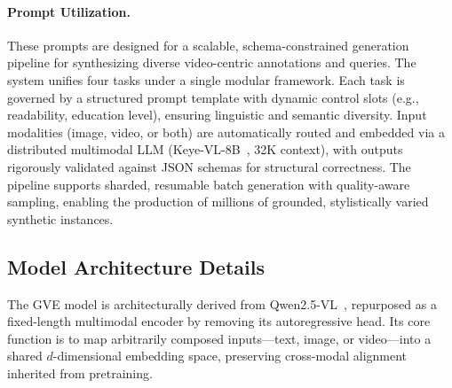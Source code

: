 \paragraph{Prompt Utilization.}
These prompts are designed for a scalable, schema-constrained generation pipeline for synthesizing diverse video-centric annotations and queries. The system unifies four tasks under a single modular framework.
Each task is governed by a structured prompt template with dynamic control slots (e.g., readability, education level), ensuring linguistic and semantic diversity. Input modalities (image, video, or both) are automatically routed and embedded via a distributed multimodal LLM (Keye-VL-8B~\cite{team2025kwai}, 32K context), with outputs rigorously validated against JSON schemas for structural correctness.
The pipeline supports sharded, resumable batch generation with quality-aware sampling, enabling the production of millions of grounded, stylistically varied synthetic instances.


\fi

\iffalse %
\subsection{Model Architecture Details}
\label{gve:app:arch}

The GVE model is architecturally derived from Qwen2.5-VL~\cite{bai2025qwen25vl}, repurposed as a fixed-length multimodal encoder by removing its autoregressive head. Its core function is to map arbitrarily composed inputs—text, image, or video—into a shared $d$-dimensional embedding space, preserving cross-modal alignment inherited from pretraining.

